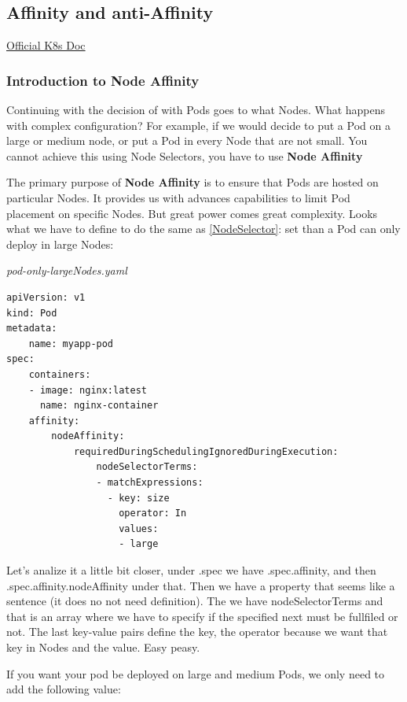 \documentclass{article}
\newenvironment{codetemplate}[1][]{%
  \mybasecolorbox[#1]
  \itshape
}{%
  \endmybasecolorbox
}
\begin{document}
\subsection{Affinity and anti-Affinity}

\href{https://kubernetes.io/docs/concepts/scheduling-eviction/assign-pod-node/}{Official K8s Doc}

\subsubsection{Introduction to Node Affinity}

Continuing with the decision of with Pods goes to what Nodes. What happens with complex configuration? For example, if we would decide to put a Pod on a large or medium node, or put a Pod in every Node that are not small. You cannot achieve this using Node Selectors, you have to use \textbf{Node Affinity}

The primary purpose of \textbf{Node Affinity} is to ensure that Pods are hosted on particular Nodes. It provides us with advances capabilities to limit Pod placement on specific Nodes. But great power comes great complexity. Looks what we have to define to do the same as \ref{NodeSelector}: set than a Pod can only deploy in large Nodes:

\begin{codetemplate}{pod-only-largeNodes.yaml}
\begin{verbatim}
apiVersion: v1
kind: Pod
metadata:
    name: myapp-pod
spec:
    containers:
    - image: nginx:latest
      name: nginx-container
    affinity:
        nodeAffinity:
            requiredDuringSchedulingIgnoredDuringExecution:
                nodeSelectorTerms:
                - matchExpressions:
                  - key: size
                    operator: In
                    values:
                    - large
\end{verbatim}
\end{codetemplate}

Let's analize it a little bit closer, under .spec we have .spec.affinity, and then .spec.affinity.nodeAffinity under that. Then we have a property that seems like a sentence (it does no not need definition). The we have nodeSelectorTerms and that is an array where we have to specify if the specified next must be fullfiled or not. The last key-value pairs define the key, the operator because we want that key in Nodes and the value. Easy peasy.

If you want your pod be deployed on large and medium Pods, we only need to add the following value:
\end{document}
